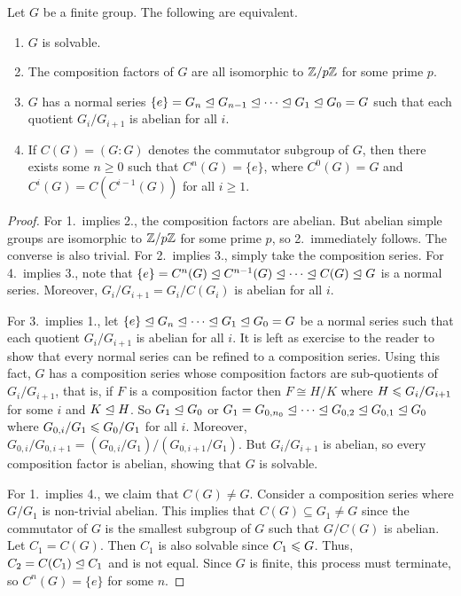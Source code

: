 \begin{proposition}
    Let $G$ be a finite group. The following are equivalent.
    \begin{enumerate}
        \item $G$ is solvable.
        \item The composition factors of $G$ are all isomorphic to $\mathbb{Z}/p\mathbb{Z}$ for some prime $p$.
        \item $G$ has a normal series $\{e\} = G_{n} \trianglelefteq G_{n-1} \trianglelefteq \cdots \trianglelefteq G_{1} \trianglelefteq G_{0} = G$ such that each quotient $G_{i}/G_{i+1}$ is abelian for all $i$.
        \item If $C(G) = (G:G)$ denotes the commutator subgroup of $G$, then there exists some $n \geq 0$ such that $C^{n}(G) = \{e\}$, where $C^{0}(G) = G$ and $C^{i}(G) = C(C^{i-1}(G))$ for all $i \geq 1$.
    \end{enumerate}
\end{proposition}
\begin{proof}
    For 1.~implies 2., the composition factors are abelian. But abelian simple groups are isomorphic to $\mathbb{Z}/p\mathbb{Z}$ for some prime $p$, so 2.~immediately follows. The converse is also trivial. For 2.~implies 3., simply take the composition series. For 4.~implies 3., note that $\{e\} = C^{n}(G) \trianglelefteq C^{n-1}(G) \trianglelefteq \cdots \trianglelefteq C(G) \trianglelefteq G$ is a normal series. Moreover, $G_{i}/G_{i+1} = G_{i}/C(G_{i})$ is abelian for all $i$.

    For 3.~implies 1., let $\{e\} \trianglelefteq G_{n} \trianglelefteq \cdots \trianglelefteq G_{1} \trianglelefteq G_{0} = G$ be a normal series such that each quotient $G_{i}/G_{i+1}$ is abelian for all $i$. It is left as exercise to the reader to show that every normal series can be refined to a composition series. Using this fact, $G$ has a composition series whose composition factors are sub-quotients of $G_{i}/G_{i+1}$, that is, if $F$ is a composition factor then $F \cong H/K$ where $H \leqslant G_{i}/G_{i+1}$ for some $i$ and $K \trianglelefteq H$. So $G_{1} \trianglelefteq G_{0}$ or $G_{1} = G_{0,n_{0}} \trianglelefteq \cdots \trianglelefteq G_{0,2} \trianglelefteq G_{0,1} \trianglelefteq G_{0}$ where $G_{0,i}/G_{1} \leqslant G_{0}/G_{1}$ for all $i$. Moreover, $G_{0,i}/G_{0,i+1} = (G_{0,i}/G_{1})/(G_{0,i+1}/G_{1})$. But $G_{i}/G_{i+1}$ is abelian, so every composition factor is abelian, showing that $G$ is solvable.

    For 1.~implies 4., we claim that $C(G) \neq G$. Consider a composition series where $G/G_{1}$ is non-trivial abelian. This implies that $C(G) \subseteq G_{1} \neq G$ since the commutator of $G$ is the smallest subgroup of $G$ such that $G/C(G)$ is abelian. Let $C_{1} = C(G)$. Then $C_{1}$ is also solvable since $C_{1} \leqslant G$. Thus, $C_{2} = C(C_{1}) \trianglelefteq C_{1}$ and is not equal. Since $G$ is finite, this process must terminate, so $C^{n}(G) = \{e\}$ for some $n$.
\end{proof}

